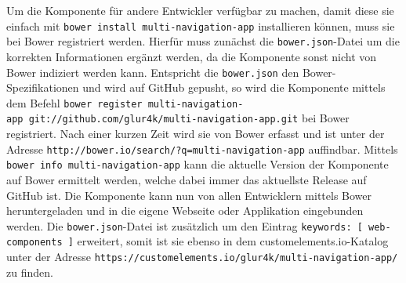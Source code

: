 Um die Komponente für andere Entwickler verfügbar zu machen, damit diese sie einfach mit \texttt{bower\ install\ multi-navigation-app} installieren können, muss sie bei Bower registriert werden. Hierfür muss zunächst die \texttt{bower.json}-Datei um die korrekten Informationen ergänzt werden, da die Komponente sonst nicht von Bower indiziert werden kann. Entspricht die \texttt{bower.json} den Bower-Spezifikationen und wird auf GitHub gepusht, so wird die Komponente mittels dem Befehl \texttt{bower\ register\ multi-navigation-app\ git://github.com/glur4k/multi-navigation-app.git} bei Bower registriert. Nach einer kurzen Zeit wird sie von Bower erfasst und ist unter der Adresse \texttt{http://bower.io/search/?q=multi-navigation-app} auffindbar. Mittels \texttt{bower\ info\ multi-navigation-app} kann die aktuelle Version der Komponente auf Bower ermittelt werden, welche dabei immer das aktuellste Release auf GitHub ist. Die Komponente kann nun von allen Entwicklern mittels Bower heruntergeladen und in die eigene Webseite oder Applikation eingebunden werden. Die \texttt{bower.json}-Datei ist zusätzlich um den Eintrag \texttt{\dq keywords\dq:\ {[}\ \dq web-components\dq\ {]}} erweitert, somit ist sie ebenso in dem customelements.io-Katalog unter der Adresse \texttt{https://customelements.io/glur4k/multi-navigation-app/} zu finden.
